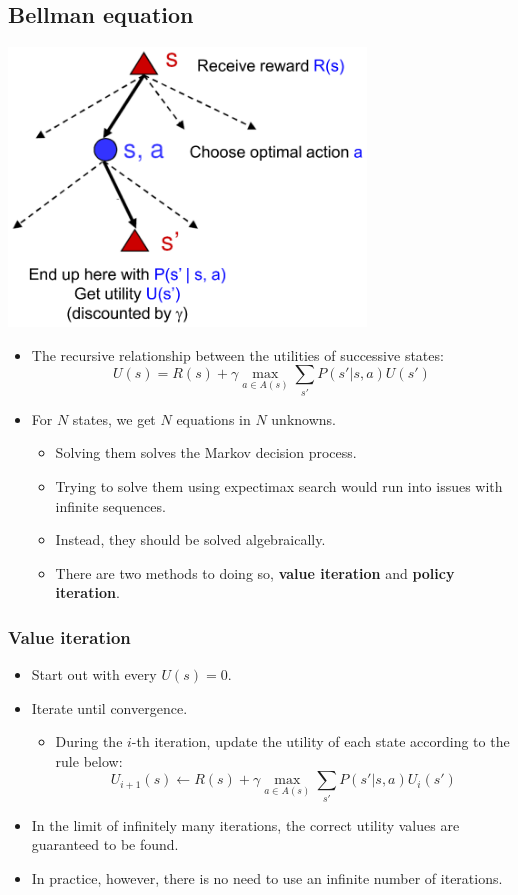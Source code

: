 \documentclass[11pt]{article}
\begin{document}
\subsection{Bellman equation}
\label{sec:org7e92e4a}
\begin{center}
\includegraphics[height=20em]{./images/bellman-equation-tree.png}
\end{center}
\begin{itemize}
\item The recursive relationship between the utilities of successive states:
\[U (s) = R(s) + \gamma \underset{a \in A(s)}{\max} \sum_{s'} P (s' | s, a) U(s')\]
\item For \(N\) states, we get \(N\) equations in \(N\) unknowns.
\begin{itemize}
\item Solving them solves the Markov decision process.
\item Trying to solve them using expectimax search would run into issues with infinite sequences.
\item Instead, they should be solved algebraically.
\item There are two methods to doing so, \textbf{value iteration} and \textbf{policy iteration}.
\end{itemize}
\end{itemize}

 \newpage
\subsubsection{Value iteration}
\label{sec:org62e6c60}
\begin{itemize}
\item Start out with every \(U(s) = 0\).
\item Iterate until convergence.
\begin{itemize}
\item During the \(i\)-th iteration, update the utility of each state according to the rule below:
\[U_{i + 1} (s) \leftarrow R(s) + \gamma \underset{a \in A(s)}{\max} \sum_{s'} P(s' | s, a) U_i (s')\]
\end{itemize}
\item In the limit of infinitely many iterations, the correct utility values are guaranteed to be found.
\item In practice, however, there is no need to use an infinite number of iterations.
\end{itemize}
\end{document}
